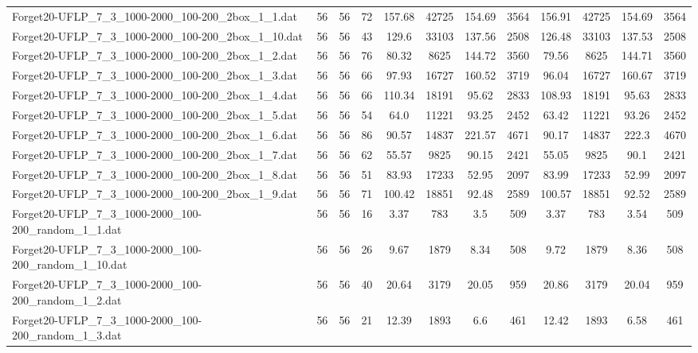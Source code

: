 \begin{sidewaystable}[!ht]
{\begin{tabular}{lccccccccccc}
Forget20-UFLP\_7\_3\_1000-2000\_100-200\_2box\_1\_1.dat & 56 & 56 & 72 & 157.68 & 42725 &  \textcolor{blue2}{154.69} & 3564 & 156.91 & 42725 &  \textcolor{blue2}{154.69} & 3564 \\
Forget20-UFLP\_7\_3\_1000-2000\_100-200\_2box\_1\_10.dat & 56 & 56 & 43 & 129.6 & 33103 & 137.56 & 2508 &  \textcolor{blue2}{126.48} & 33103 & 137.53 & 2508 \\
Forget20-UFLP\_7\_3\_1000-2000\_100-200\_2box\_1\_2.dat & 56 & 56 & 76 & 80.32 & 8625 & 144.72 & 3560 & 79.56 & 8625 & 144.71 & 3560 \\
Forget20-UFLP\_7\_3\_1000-2000\_100-200\_2box\_1\_3.dat & 56 & 56 & 66 & 97.93 & 16727 & 160.52 & 3719 &  \textcolor{blue2}{96.04} & 16727 & 160.67 & 3719 \\
Forget20-UFLP\_7\_3\_1000-2000\_100-200\_2box\_1\_4.dat & 56 & 56 & 66 & 110.34 & 18191 & 95.62 & 2833 & 108.93 & 18191 & 95.63 & 2833 \\
Forget20-UFLP\_7\_3\_1000-2000\_100-200\_2box\_1\_5.dat & 56 & 56 & 54 & 64.0 & 11221 & 93.25 & 2452 & 63.42 & 11221 & 93.26 & 2452 \\
Forget20-UFLP\_7\_3\_1000-2000\_100-200\_2box\_1\_6.dat & 56 & 56 & 86 & 90.57 & 14837 & 221.57 & 4671 & 90.17 & 14837 & 222.3 & 4670 \\
Forget20-UFLP\_7\_3\_1000-2000\_100-200\_2box\_1\_7.dat & 56 & 56 & 62 & 55.57 & 9825 & 90.15 & 2421 & 55.05 & 9825 & 90.1 & 2421 \\
Forget20-UFLP\_7\_3\_1000-2000\_100-200\_2box\_1\_8.dat & 56 & 56 & 51 & 83.93 & 17233 &  \textcolor{blue2}{52.95} & 2097 & 83.99 & 17233 & 52.99 & 2097 \\
Forget20-UFLP\_7\_3\_1000-2000\_100-200\_2box\_1\_9.dat & 56 & 56 & 71 & 100.42 & 18851 &  \textcolor{blue2}{92.48} & 2589 & 100.57 & 18851 & 92.52 & 2589 \\
Forget20-UFLP\_7\_3\_1000-2000\_100-200\_random\_1\_1.dat & 56 & 56 & 16 & 3.37 & 783 & 3.5 & 509 & 3.37 & 783 & 3.54 & 509 \\
Forget20-UFLP\_7\_3\_1000-2000\_100-200\_random\_1\_10.dat & 56 & 56 & 26 & 9.67 & 1879 &  \textcolor{blue2}{8.34} & 508 & 9.72 & 1879 & 8.36 & 508 \\
Forget20-UFLP\_7\_3\_1000-2000\_100-200\_random\_1\_2.dat & 56 & 56 & 40 & 20.64 & 3179 & 20.05 & 959 & 20.86 & 3179 &  \textcolor{blue2}{20.04} & 959 \\
Forget20-UFLP\_7\_3\_1000-2000\_100-200\_random\_1\_3.dat & 56 & 56 & 21 & 12.39 & 1893 & 6.6 & 461 & 12.42 & 1893 &  \textcolor{blue2}{6.58} & 461 \\

\end{tabular}}
\end{sidewaystable}
